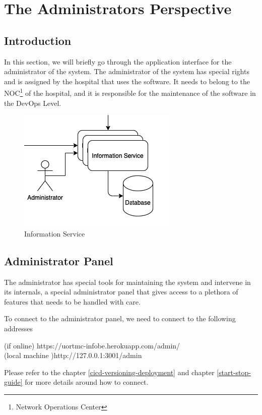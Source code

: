 \chapter{The Administrators Perspective}
\label{admin_perspective}
	\section{Introduction}
		In this section, we will briefly go through the application interface for the administrator of the system. 
		The administrator of the system has special rights and is assigned by the hospital that uses the software. 
		It needs to belong to the NOC\footnote{Network  Operations Center} of the hospital, and it is responsible for 
		the maintenance of the software in the DevOps Level.
		\begin{figure}[H]
			\iftrue
			\caption{Information Service}
			\centering
			\includegraphics[scale=0.5]{figures/infobe}
			\fi
		\end{figure}
	\section{Administrator Panel}
		The administrator has special tools for maintaining the system and intervene in its internals, a special administrator panel that gives access to a 
		plethora of features that needs to be handled with care. 
		\begin{note}
			To connect to the administrator panel, we need to connect to the following addresses\\
			\begin{center}
				(if online) https://uortmc-infobe.herokuapp.com/admin/ \\
				(local machine )http://127.0.0.1:3001/admin
			\end{center}
			Please refer to the chapter \ref{cicd-versioning-deployment} and chapter \ref{start-stop-guide} for more details around how to connect.
		\end{note}
